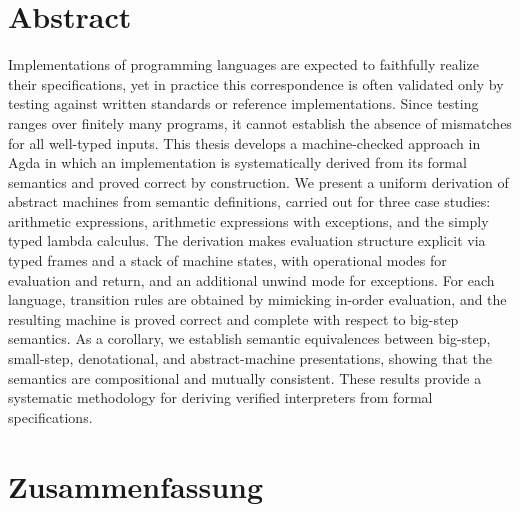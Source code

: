 
\clearpage
{}
\section*{Abstract}

\begin{center}
\begin{minipage}[t]{0.7\textwidth}
	Implementations of programming languages are expected to faithfully realize their specifications, yet in practice this correspondence is often validated only by testing against written standards or reference implementations. 
	Since testing ranges over finitely many programs, it cannot establish the absence of mismatches for all well-typed inputs. 
	This thesis develops a machine-checked approach in Agda in which an implementation is systematically derived from its formal semantics and proved correct by construction. 
	We present a uniform derivation of abstract machines from semantic definitions, carried out for three case studies: arithmetic expressions, arithmetic expressions with exceptions, and the simply typed lambda calculus. 
	The derivation makes evaluation structure explicit via typed frames and a stack of machine states, with operational modes for evaluation and return, and an additional unwind mode for exceptions. 
	For each language, transition rules are obtained by mimicking in-order evaluation, and the resulting machine is proved correct and complete with respect to big-step semantics. 
	As a corollary, we establish semantic equivalences between big-step, small-step, denotational, and abstract-machine presentations, showing that the semantics are compositional and mutually consistent. 
	These results provide a systematic methodology for deriving verified interpreters from formal specifications.
\end{minipage}
\end{center}

\vfill

\section*{Zusammenfassung}


